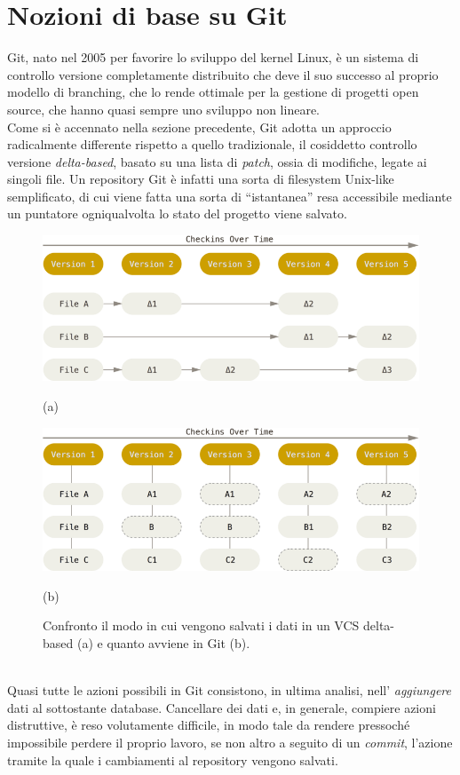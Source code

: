 \documentclass[12pt]{article}
\def\quote#1{``#1''}
\begin{document}
\section{Nozioni di base su Git}
Git, nato nel 2005 per favorire lo sviluppo del kernel Linux, è un sistema di controllo versione completamente distribuito che deve il suo successo al proprio modello di branching, che lo rende ottimale per la gestione di progetti open source, che hanno quasi sempre uno sviluppo non lineare.
\bigskip \\
Come si è accennato nella sezione precedente, Git adotta un approccio radicalmente differente rispetto a quello tradizionale, il cosiddetto controllo versione \textit{delta-based}, basato su una lista di \textit{patch}, ossia di modifiche, legate ai singoli file. Un repository Git è infatti una sorta di filesystem Unix-like semplificato, di cui viene fatta una sorta di \quote{istantanea} resa accessibile mediante un puntatore ogniqualvolta lo stato del progetto viene salvato.
\begin{figure}[h]
	\centering
	\includegraphics[width=13cm]{delta-based.png}
	\caption*{(a)\bigskip}
	\includegraphics[width=13cm]{snapshots-based.png}
	\caption*{(b)}
	\caption{Confronto il modo in cui vengono salvati i dati in un VCS delta-based (a) e quanto avviene in Git (b).}
\end{figure}
\bigskip \\
Quasi tutte le azioni possibili in Git consistono, in ultima analisi, nell' \textit{aggiungere} dati al sottostante database. Cancellare dei dati e, in generale, compiere azioni distruttive, è reso volutamente difficile, in modo tale da rendere pressoché impossibile perdere il proprio lavoro, se non altro a seguito di un \textit{commit}, l'azione tramite la quale i cambiamenti al repository vengono salvati.
\end{document}
